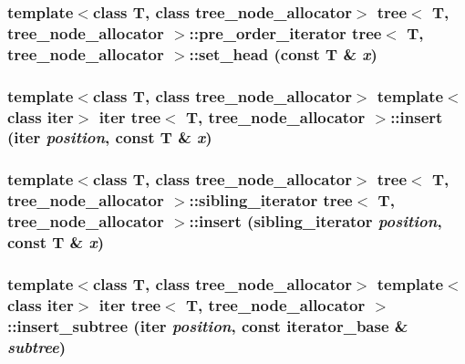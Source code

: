 \hypertarget{classtree_f11d736ea971ab93651350161f5a7535}{
\subsubsection{\setlength{\rightskip}{0pt plus 5cm}template$<$class T, class tree\_\-node\_\-allocator$>$ {\bf tree}$<$ T, tree\_\-node\_\-allocator $>$::{\bf pre\_\-order\_\-iterator} {\bf tree}$<$ T, tree\_\-node\_\-allocator $>$::set\_\-head (const T \& {\em x})}}
\label{classtree_f11d736ea971ab93651350161f5a7535}


\hypertarget{classtree_c3d19d3a42f91618267674f2c236aad9}{
\subsubsection{\setlength{\rightskip}{0pt plus 5cm}template$<$class T, class tree\_\-node\_\-allocator$>$ template$<$class iter$>$ iter {\bf tree}$<$ T, tree\_\-node\_\-allocator $>$::insert (iter {\em position}, \/  const T \& {\em x})}}
\label{classtree_c3d19d3a42f91618267674f2c236aad9}


\hypertarget{classtree_429bbd485078981ef83b59a779d9f947}{
\subsubsection{\setlength{\rightskip}{0pt plus 5cm}template$<$class T, class tree\_\-node\_\-allocator$>$ {\bf tree}$<$ T, tree\_\-node\_\-allocator $>$::{\bf sibling\_\-iterator} {\bf tree}$<$ T, tree\_\-node\_\-allocator $>$::insert ({\bf sibling\_\-iterator} {\em position}, \/  const T \& {\em x})}}
\label{classtree_429bbd485078981ef83b59a779d9f947}


\hypertarget{classtree_d66d55d58b48ce0a8d7a5b41abe923d5}{
\subsubsection{\setlength{\rightskip}{0pt plus 5cm}template$<$class T, class tree\_\-node\_\-allocator$>$ template$<$class iter$>$ iter {\bf tree}$<$ T, tree\_\-node\_\-allocator $>$::insert\_\-subtree (iter {\em position}, \/  const {\bf iterator\_\-base} \& {\em subtree})}}
\label{classtree_d66d55d58b48ce0a8d7a5b41abe923d5}


